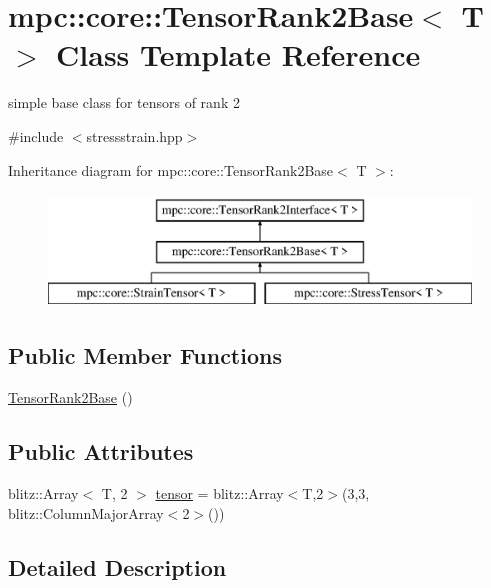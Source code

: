 \hypertarget{structmpc_1_1core_1_1_tensor_rank2_base}{}\section{mpc\+:\+:core\+:\+:Tensor\+Rank2\+Base$<$ T $>$ Class Template Reference}
\label{structmpc_1_1core_1_1_tensor_rank2_base}


simple base class for tensors of rank 2  




{\ttfamily \#include $<$stressstrain.\+hpp$>$}

Inheritance diagram for mpc\+:\+:core\+:\+:Tensor\+Rank2\+Base$<$ T $>$\+:\begin{figure}[H]
\begin{center}
\leavevmode
\includegraphics[height=3.000000cm]{structmpc_1_1core_1_1_tensor_rank2_base}
\end{center}
\end{figure}
\subsection*{Public Member Functions}
\begin{DoxyCompactItemize}
\item 
\mbox{\hyperlink{structmpc_1_1core_1_1_tensor_rank2_base_adf3208464cf45f6caf3c78dee1a3c7d1}{Tensor\+Rank2\+Base}} ()
\end{DoxyCompactItemize}
\subsection*{Public Attributes}
\begin{DoxyCompactItemize}
\item 
blitz\+::\+Array$<$ T, 2 $>$ \mbox{\hyperlink{structmpc_1_1core_1_1_tensor_rank2_base_a75703dce1b26306b8f0ee539775ee6d7}{tensor}} = blitz\+::\+Array$<$T,2$>$(3,3, blitz\+::\+Column\+Major\+Array$<$2$>$())
\end{DoxyCompactItemize}


\subsection{Detailed Description}
